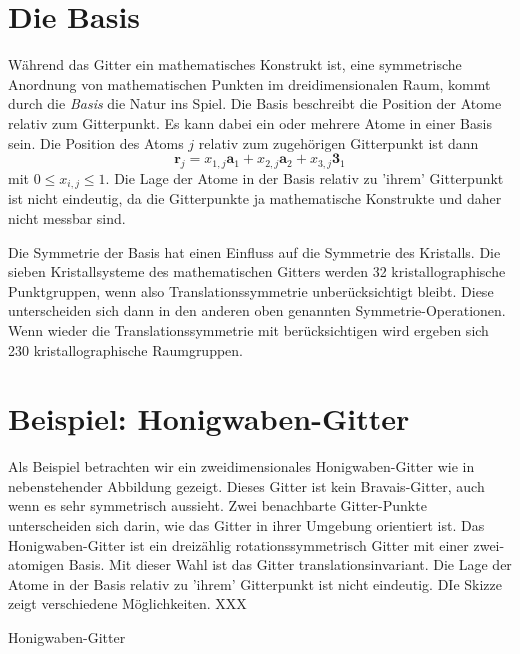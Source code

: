\section{Die Basis}


Während das Gitter ein mathematisches Konstrukt ist, eine symmetrische Anordnung von mathematischen Punkten im dreidimensionalen Raum, kommt durch die \emph{Basis} die Natur ins Spiel. Die Basis beschreibt die Position der Atome relativ zum Gitterpunkt. Es kann dabei ein oder mehrere Atome in einer Basis sein. Die Position des Atoms $j$ relativ zum zugehörigen Gitterpunkt ist dann 
\begin{equation}
 \mathbf{r}_j = x_{1,j} \mathbf{a}_1 + x_{2,j} \mathbf{a}_2 + x_{3,j} \mathbf{3}_1  
\end{equation}
mit $0 \le x_{i,j} \le 1$. Die Lage der Atome in der Basis relativ zu 'ihrem' Gitterpunkt ist nicht eindeutig, da die Gitterpunkte ja mathematische Konstrukte und daher nicht messbar sind.


Die Symmetrie der Basis hat einen Einfluss auf die Symmetrie des Kristalls. Die sieben Kristallsysteme des mathematischen Gitters werden 32 kristallographische Punktgruppen, wenn also Translationssymmetrie unberücksichtigt bleibt. Diese unterscheiden sich dann in den anderen oben genannten Symmetrie-Operationen.
Wenn wieder die Translationssymmetrie mit berücksichtigen wird ergeben sich 230 kristallographische Raumgruppen.


\section{Beispiel: Honigwaben-Gitter}

Als Beispiel betrachten wir ein zweidimensionales Honigwaben-Gitter wie in nebenstehender Abbildung gezeigt. Dieses Gitter ist kein Bravais-Gitter, auch wenn es sehr symmetrisch aussieht. Zwei benachbarte Gitter-Punkte unterscheiden sich darin, wie das Gitter in ihrer Umgebung orientiert ist. Das  Honigwaben-Gitter ist ein dreizählig rotationssymmetrisch Gitter mit einer zwei-atomigen Basis. Mit dieser Wahl ist das Gitter translationsinvariant. Die Lage der Atome in der Basis relativ zu 'ihrem' Gitterpunkt ist nicht eindeutig. DIe Skizze zeigt verschiedene Möglichkeiten. XXX



\begin{marginfigure}

\caption{Honigwaben-Gitter}
\end{marginfigure}


